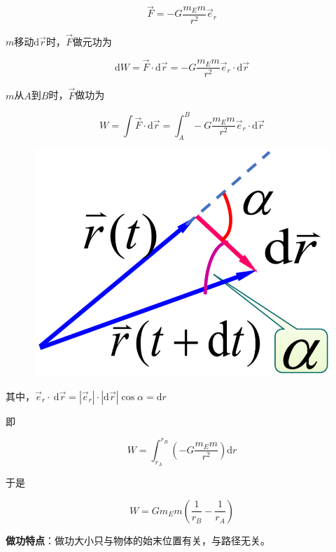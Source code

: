 \documentclass[
	12pt, %
	a4paper, %
]{myLegrandOrangeBook}
\newcommand{\rmd}{\mathrm{d}}
\begin{document}
$$
    \overrightarrow{F}=-G \frac{m_{E} m}{r^2} \overrightarrow{e}_r
$$

\(m\)移动\(\rmd \overrightarrow{r}\)时，\(\overrightarrow{F}\)做元功为

$$
    \rmd W = \overrightarrow{F} \cdot \rmd \overrightarrow{r}
    =-G \frac{m_{E} m}{r^2} \overrightarrow{e}_r \cdot \rmd \overrightarrow{r}
$$

\(m\)从\(A\)到\(B\)时，\(\overrightarrow{F}\)做功为

$$
W=\int \overrightarrow{F} \cdot \rmd \overrightarrow{r}
=\int_A^B-G \frac{m_{E} m}{r^2} \overrightarrow{e}_r \cdot \rmd \overrightarrow{r}
$$

\begin{figure}
    \centering
    \includegraphics[scale=0.15]{"Chapter 03 images/pic6.png"}
    \label{pic6}
\end{figure}

其中，$\overrightarrow{e}_r \cdot \mathrm{~d} \overrightarrow{r}=
\left|\overrightarrow{e}_r\right| \cdot|\mathrm{d} \overrightarrow{r}| \cos \alpha=\mathrm{d} r$

即

$$
    W=\int_{r_A}^{r_B} \left(-G \frac{m_E m}{r^2}\right) \rmd r
$$

于是

\begin{equation}
    W=G m_{E} m\left(\frac{1}{r_B}-\frac{1}{r_A}\right)
\end{equation}

\textbf{做功特点}：做功大小只与物体的始末位置有关，与路径无关。
\end{document}
